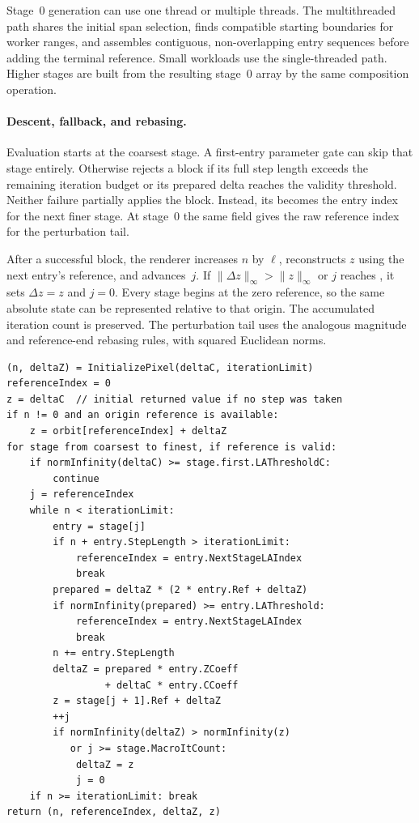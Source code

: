 Stage~0 generation can use one thread or multiple threads. The
multithreaded path shares the initial span selection, finds compatible
starting boundaries for worker ranges, and assembles contiguous,
non-overlapping entry sequences before adding the terminal reference.
Small workloads use the single-threaded path. Higher stages are built
from the resulting stage~0 array by the same composition operation.

\paragraph{Descent, fallback, and rebasing.}
Evaluation starts at the coarsest stage. A first-entry parameter gate
can skip that stage entirely. Otherwise  rejects a block
if its full step length exceeds the remaining iteration budget or
its prepared delta reaches the validity threshold. Neither failure
partially applies the block. Instead, its 
becomes the entry index for the next finer stage. At stage~0 the same
field gives the raw reference index for the perturbation tail.

After a successful block, the renderer increases $n$ by $\ell$,
reconstructs $z$ using the next entry's reference, and advances~$j$.
If $\lVert\Delta z\rVert_\infty>\lVert z\rVert_\infty$ or $j$ reaches
, it sets $\Delta z=z$ and $j=0$. Every stage begins
at the zero reference, so the same absolute state can be represented
relative to that origin. The accumulated iteration count is preserved.
The perturbation tail uses the analogous magnitude and reference-end
rebasing rules, with squared Euclidean norms.

\begin{lstlisting}[float=htbp,caption={Shared per-pixel AT and LA traversal},label={lst:la-traversal}]
(n, deltaZ) = InitializePixel(deltaC, iterationLimit)
referenceIndex = 0
z = deltaC  // initial returned value if no step was taken
if n != 0 and an origin reference is available:
    z = orbit[referenceIndex] + deltaZ
for stage from coarsest to finest, if reference is valid:
    if normInfinity(deltaC) >= stage.first.LAThresholdC:
        continue
    j = referenceIndex
    while n < iterationLimit:
        entry = stage[j]
        if n + entry.StepLength > iterationLimit:
            referenceIndex = entry.NextStageLAIndex
            break
        prepared = deltaZ * (2 * entry.Ref + deltaZ)
        if normInfinity(prepared) >= entry.LAThreshold:
            referenceIndex = entry.NextStageLAIndex
            break
        n += entry.StepLength
        deltaZ = prepared * entry.ZCoeff
                 + deltaC * entry.CCoeff
        z = stage[j + 1].Ref + deltaZ
        ++j
        if normInfinity(deltaZ) > normInfinity(z)
           or j >= stage.MacroItCount:
            deltaZ = z
            j = 0
    if n >= iterationLimit: break
return (n, referenceIndex, deltaZ, z)
\end{lstlisting}

